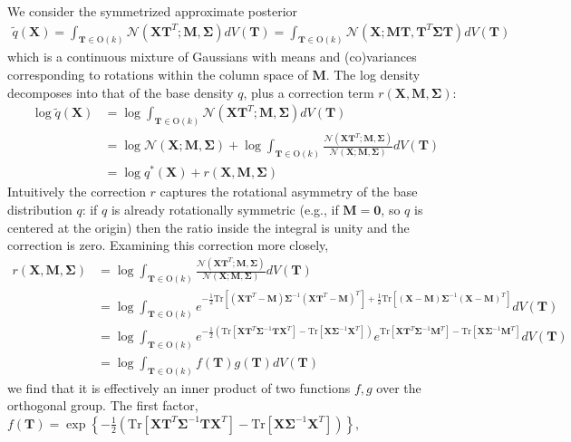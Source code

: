 \documentclass{article}
\newcommand{\N}{\mathcal{N}}
\newcommand{\Tr}{\text{Tr}}
\renewcommand{\O}{\text{O}}
\renewcommand{\v}[1]{\mathbf{#1}}
\begin{document}
We consider the symmetrized approximate posterior
\begin{align*}
\tilde{q}(\v{X}) = \int_{\v{T}\in \O(k)} \N(\v{X}\v{T}^T; \v{M}, \v{\Sigma}) dV(\v{T}) = \int_{\v{T}\in \O(k)} \N(\v{X}; \v{M}\v{T}, \v{T}^T \v{\Sigma} \v{T}) dV(\v{T})
\end{align*}
which is a continuous mixture of Gaussians with means and (co)variances
corresponding to rotations within the column space of $\v{M}$. The log
density decomposes into that of the base density $q$, plus a correction term $r(\v{X}, \v{M}, \v{\Sigma})$:
\begin{align}
\log \tilde{q}(\v{X}) &= \log \int_{\v{T}\in \O(k)} \N(\v{X}\v{T}^T; \v{M}, \v{\Sigma}) dV(\v{T})\nonumber\\
&=\log \N(\v{X}; \v{M}, \v{\Sigma}) + \log \int_{\v{T}\in \O(k)} \frac{\N(\v{X}\v{T}^T; \v{M}, \v{\Sigma})}{\N(\v{X}; \v{M}, \v{\Sigma} ) }  dV(\v{T})\nonumber\\
&=\log q^*(\v{X}) + r(\v{X}, \v{M}, \v{\Sigma})\label{eqn:symmetrized_orthog}
\end{align}
Intuitively the correction $r$ captures the rotational asymmetry of the
base distribution $q$: if $q$ is already rotationally symmetric (e.g.,
if $\v{M}=\v{0}$, so $q$ is centered at the origin)
then the ratio inside the integral is unity and the correction is zero. Examining this correction more closely,
\begin{align*}
r(\v{X}, \v{M}, \v{\Sigma}) &= \log \int_{\v{T}\in \O(k)} \frac{\N(\v{X}\v{T}^T; \v{M}, \v{\Sigma})}{\N(\v{X}; \v{M}, \v{\Sigma} ) }  dV(\v{T})\\
&= \log \int_{\v{T}\in \O(k)} e^{-\frac{1}{2} \Tr \left[
  (\v{X}\v{T}^T-\v{M})\v{\Sigma}^{-1}(\v{X}\v{T}^T-\v{M})^T \right] + \frac{1}{2}\Tr \left[
  (\v{X}-\v{M})\v{\Sigma}^{-1}(\v{X}-\v{M})^T \right] }  dV(\v{T})\\
&= \log \int_{\v{T}\in \O(k)} e^{-\frac{1}{2} \left( \Tr \left[\v{X}\v{T}^T\v{\Sigma}^{-1}\v{T}\v{X}^T\right] - \Tr\left[\v{X}\v{\Sigma}^{-1}\v{X}^T\right]\right)}
  e^{\Tr\left[\v{X}\v{T}^T\v{\Sigma}^{-1}\v{M}^T \right] - \Tr\left[\v{X}\v{\Sigma}^{-1}\v{M}^T\right]} dV(\v{T})\\
&= \log \int_{\v{T}\in \O(k)} f(\v{T}) g(\v{T}) dV(\v{T})
\end{align*}
we find that it is effectively an inner product of two functions $f,g$
over the orthogonal group. The first factor, $f(\v{T}) = \exp\left\{-\frac{1}{2}
  \left( \Tr \left[\v{X}\v{T}^T\v{\Sigma}^{-1}\v{T}\v{X}^T\right] -
    \Tr\left[\v{X}\v{\Sigma}^{-1}\v{X}^T\right]\right)\right\},$
\end{document}
